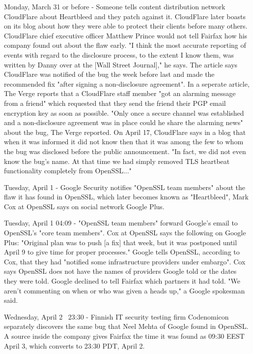 Monday, March 31 or before - Someone tells content distribution network CloudFlare about Heartbleed and they patch against it. CloudFlare later boasts on its blog about how they were able to protect their clients before many others. CloudFlare chief executive officer Matthew Prince would not tell Fairfax how his company found out about the flaw early. "I think the most accurate reporting of events with regard to the disclosure process, to the extent I know them, was written by Danny over at the [Wall Street Journal]," he says. The article says CloudFlare was notified of the bug the week before last and made the recommended fix "after signing a non-disclosure agreement". In a seperate article, The Verge reports that a CloudFlare staff member "got an alarming message from a friend" which requested that they send the friend their PGP email encryption key as soon as possible. "Only once a secure channel was established and a non-disclosure agreement was in place could he share the alarming news" about the bug, The Verge reported. On April 17, CloudFlare says in a blog that when it was informed it did not know then that it was among the few to whom the bug was disclosed before the public announcement. "In fact, we did not even know the bug's name. At that time we had simply removed TLS heartbeat functionality completely from OpenSSL..."

Tuesday, April 1 - Google Security notifies "OpenSSL team members" about the flaw it has found in OpenSSL, which later becomes known as "Heartbleed", Mark Cox at OpenSSL says on social network Google Plus.

Tuesday, April 1 04:09 - "OpenSSL team members" forward Google's email to OpenSSL's "core team members". Cox at OpenSSL says the following on Google Plus: "Original plan was to push [a fix] that week, but it was postponed until April 9 to give time for proper processes." Google tells OpenSSL, according to Cox, that they had "notified some infrastructure providers under embargo". Cox says OpenSSL does not have the names of providers Google told or the dates they were told. Google declined to tell Fairfax which partners it had told. "We aren't commenting on when or who was given a heads up," a Google spokesman said.

Wednesday, April 2 ~23:30  - Finnish IT security testing firm Codenomicon separately discovers the same bug that Neel Mehta of Google found in OpenSSL. A source inside the company gives Fairfax the time it was found as 09:30 EEST April 3, which converts to 23:30 PDT, April 2.

